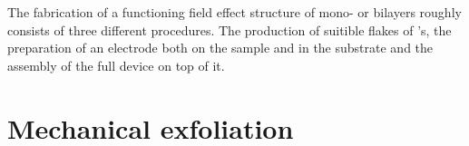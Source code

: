 The fabrication of a functioning field effect structure of \tmdg mono- or bilayers roughly consists of three different procedures. The production of suitible flakes of \tmd's, the preparation of an electrode both on the sample and in the substrate and the assembly of the full device on top of it. 

\section{Mechanical exfoliation}
\begin{figure}
\centering
\begin{subfigure}{0.4\textwidth}
	\caption{}
\end{subfigure}
\begin{subfigure}{0.349\textwidth}
	\caption{}
	\begin{tikzpicture}

\end{tikzpicture}
\end{subfigure}
\end{figure}

